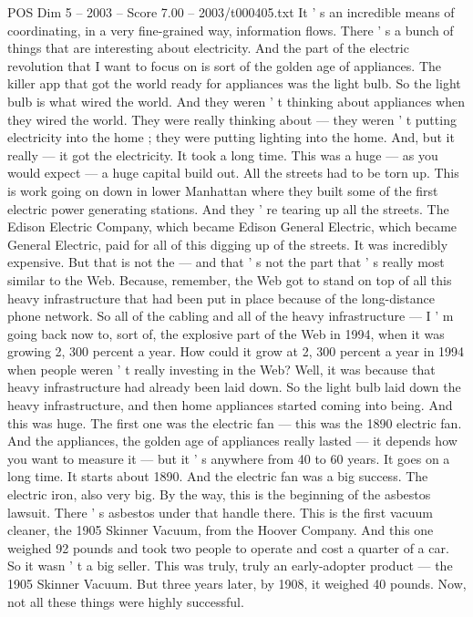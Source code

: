 \begin{textsample}{POS Dim 5 – 2003 – Score 7.00 – 2003/t000405.txt}
It ' s an incredible means of coordinating, in a very fine-grained way, information flows.
There ' s a bunch of things that are interesting about electricity.
And the part of the electric revolution that I want to focus on is sort of the golden age of appliances.
The killer app that got the world ready for appliances was the light bulb.
So the light bulb is what wired the world.
And they weren ' t thinking about appliances when they wired the world.
They were really thinking about — they weren ' t putting electricity into the home ; they were putting lighting into the home.
And, but it really — it got the electricity.
It took a long time.
This was a huge — as you would expect — a huge capital build out.
All the streets had to be torn up.
This is work going on down in lower Manhattan where they built some of the first electric power generating stations.
And they ' re tearing up all the streets.
The Edison Electric Company, which became Edison General Electric, which became General Electric, paid for all of this digging up of the streets.
It was incredibly expensive.
But that is not the — and that ' s not the part that ' s really most similar to the Web.
Because, remember, the Web got to stand on top of all this heavy infrastructure that had been put in place because of the long-distance phone network.
So all of the cabling and all of the heavy infrastructure — I ' m going back now to, sort of, the explosive part of the Web in 1994, when it was growing 2, 300 percent a year.
How could it grow at 2, 300 percent a year in 1994 when people weren ' t really investing in the Web?
Well, it was because that heavy infrastructure had already been laid down.
So the light bulb laid down the heavy infrastructure, and then home appliances started coming into being.
And this was huge.
The first one was the electric fan — this was the 1890 electric fan.
And the appliances, the golden age of appliances really lasted — it depends how you want to measure it — but it ' s anywhere from 40 to 60 years.
It goes on a long time.
It starts about 1890.
And the electric fan was a big success.
The electric iron, also very big.
By the way, this is the beginning of the asbestos lawsuit.
There ' s asbestos under that handle there.
This is the first vacuum cleaner, the 1905 Skinner Vacuum, from the Hoover Company.
And this one weighed 92 pounds and took two people to operate and cost a quarter of a car.
So it wasn ' t a big seller.
This was truly, truly an early-adopter product — the 1905 Skinner Vacuum.
But three years later, by 1908, it weighed 40 pounds.
Now, not all these things were highly successful.

\end{textsample}
